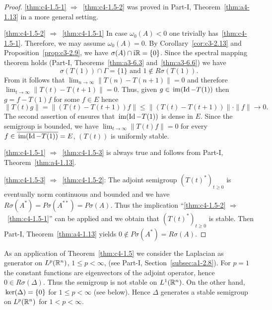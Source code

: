 \begin{proof}
\ref{thm:c4-1.5-1} $\Rightarrow$~\ref{thm:c4-1.5-2} was proved in Part-I, Theorem~\ref{thm:a4-1.13} in a more general setting.

\ref{thm:c4-1.5-2} $\Rightarrow$~\ref{thm:c4-1.5-1} In case $\omega_{0}(A) < 0$ one trivially has~\ref{thm:c4-1.5-1}.
Therefore, we may assume $\omega_{0}(A) = 0$.
By Corollary~\ref{cor:c3-2.13} and Proposition~\ref{prop:c3-2.9},  we have $\sigma(A) \cap \mathrm{i}\mathbb{R} = \{0\}$.
Since the spectral mapping theorem holds 
(\cf Part-I, Theorems~\ref{thm:a3-6.3} and~\ref{thm:a3-6.6}) we have
\begin{equation}\label{eq:c4-1.5}
\sigma(T(1)) \cap \Gamma = \{1\} \text{ and } 1 \notin R{\sigma}(T(1)).
\end{equation}
From  it follows that $\lim_{n \to \infty} \|T(n) - T(n+1)\| = 0$ and therefore $\lim_{t \to \infty} \|T(t) - T(t+1)\| = 0$.
Thus, given $g \in \mathop{}\mathrm{im}(\operatorname{Id} - T(1))$ then $g = f - T(1)f$ for some $f \in E$ hence 
\[
\|T(t)g\| = \|(T(t) - T(t+1))f\| \leq \|(T(t) - T(t+1))\| \cdot \|f\| \to 0.
\]
The second assertion of  ensures that $\mathop{}\mathrm{im}(\operatorname{Id} - T(1))$ is dense in $E$.
Since the semigroup is bounded, we have $\lim_{t \to \infty} \|T(t)f\| = 0$ for every $f \in \overline{\mathop{}\mathrm{im}(\operatorname{Id} - T(1))} = E$, \ie  $(T(t))$ is uniformly stable.

\ref{thm:c4-1.5-1} $\Rightarrow$~\ref{thm:c4-1.5-3} is always true and follows from Part-I, Theorem~\ref{thm:a4-1.13}.

\ref{thm:c4-1.5-3} $\Rightarrow$~\ref{thm:c4-1.5-2}:  
The adjoint semigroup $(T(t)^*)_{t \geq 0}$ is eventually norm continuous and boun\-ded and we have $R{\sigma}(A^*) = P{\sigma}(A^{**}) = P{\sigma}(A)$.
Thus the implication \enquote{\ref{thm:c4-1.5-2} $\Rightarrow$~\ref{thm:c4-1.5-1}} can be applied and we obtain that $(T(t)^*)_{t \geq 0}$ is stable.
Then Part-I, Theorem~\ref{thm:a4-1.13} yields $0 \notin P{\sigma}(A^*) = R{\sigma}(A)$.
\end{proof}
As an application of Theorem~\ref{thm:c4-1.5}  we consider the Laplacian as generator on $L^{p}(\mathbb{R}^{n})$, $1 \leq p < \infty$, (see Part-I, Section~\ref{subsec:a1-2.8}).
For $p = 1$ the constant functions are eigenvectors of the adjoint operator, hence $0 \in R{\sigma}(\Delta)$.
Thus the semigroup is not stable on $L^{1}(\mathbb{R}^{n})$.
On the other hand, $\mathop{}\mathrm{ker}(\Delta) =\{ 0 \}$ for $ 1 \leq p < \infty$ (see below). 
Hence $\Delta$ generates a stable semigroup on $L^{p}(\mathbb{R}^{n})$ for $1 < p < \infty$.


